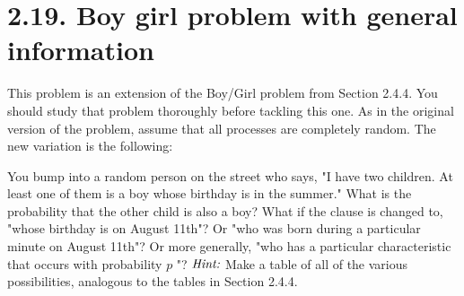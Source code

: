 \section*{2.19. Boy girl problem with general information}
This problem is an extension of the Boy/Girl problem from Section 2.4.4. You should study that 
problem thoroughly before tackling this one. As in the original version of the problem, assume
that all processes are completely random. The new variation is the following:

You bump into a random person on the street who says, "I have two children. At least one of them
is a boy whose birthday is in the summer." What is the probability that the other child is also 
a boy? What if the clause is changed to, "whose birthday is on August 11th"? Or "who was born
during a particular minute on August 11th"? Or more generally, "who has a particular characteristic
that occurs with probability $p$ "? $\emph{Hint:}$ Make a table of all of the various possibilities,
analogous to the tables in Section 2.4.4.

\vspace{1em}

